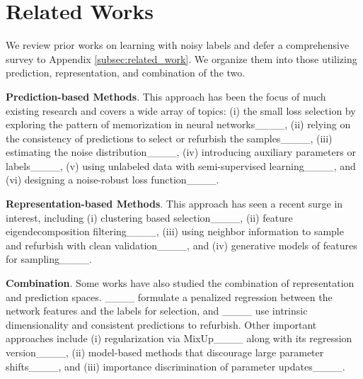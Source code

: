 \section{Related Works}
\label{sec:related_works}
\vskip -0.05in
We review prior works on learning with noisy labels and defer a comprehensive survey to Appendix \ref{subsec:related_work}. %
We organize them into those utilizing prediction, representation, and combination of the two.

\textbf{Prediction-based Methods}.
This approach has been the focus of much existing research and covers a wide array of topics: (i) 
the small loss selection by exploring the pattern of memorization in neural networks____, 
(ii) relying on the consistency of predictions to select or refurbish the samples____,
(iii) estimating the noise distribution____,
(iv) introducing auxiliary parameters or labels____,
(v) using unlabeled data with semi-supervised learning____, 
and (vi) designing a noise-robust loss function____.

\textbf{Representation-based Methods}.
This approach has seen a recent surge in interest, including
(i) clustering based selection____,
(ii) feature eigendecomposition filtering____, %
(iii) using neighbor information to sample and refurbish with clean validation____,
and (iv) generative models of features for sampling____.

\textbf{Combination}.
Some works have also studied the combination of representation and prediction spaces.
____ formulate a penalized regression between the network features and the labels for selection,
and ____ use intrinsic dimensionality and consistent predictions to refurbish.
Other important approaches include (i) regularization via MixUp____ along with its regression version____,
(ii) model-based methods that discourage large parameter shifts____, and (iii) importance discrimination of parameter updates____.

